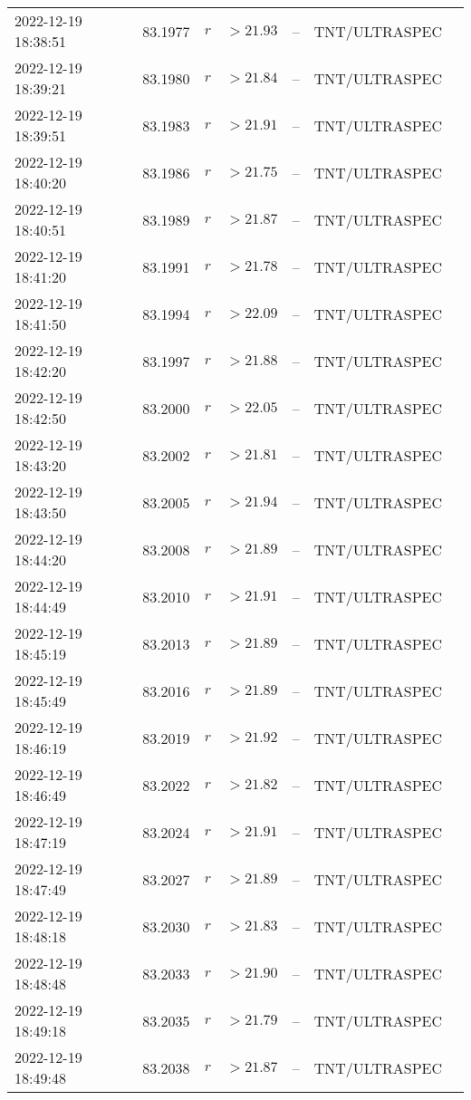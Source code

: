 \documentclass{nature_plusfigure}
\begin{document}
\begin{supplement}
\begin{center}
\begin{longtable}{lllllll}
2022-12-19 18:38:51 & 83.1977 & $r$ & $>21.93$ & -- & TNT/ULTRASPEC &  \\ 
2022-12-19 18:39:21 & 83.1980 & $r$ & $>21.84$ & -- & TNT/ULTRASPEC &  \\ 
2022-12-19 18:39:51 & 83.1983 & $r$ & $>21.91$ & -- & TNT/ULTRASPEC &  \\ 
2022-12-19 18:40:20 & 83.1986 & $r$ & $>21.75$ & -- & TNT/ULTRASPEC &  \\ 
2022-12-19 18:40:51 & 83.1989 & $r$ & $>21.87$ & -- & TNT/ULTRASPEC &  \\ 
2022-12-19 18:41:20 & 83.1991 & $r$ & $>21.78$ & -- & TNT/ULTRASPEC &  \\ 
2022-12-19 18:41:50 & 83.1994 & $r$ & $>22.09$ & -- & TNT/ULTRASPEC &  \\ 
2022-12-19 18:42:20 & 83.1997 & $r$ & $>21.88$ & -- & TNT/ULTRASPEC &  \\ 
2022-12-19 18:42:50 & 83.2000 & $r$ & $>22.05$ & -- & TNT/ULTRASPEC &  \\ 
2022-12-19 18:43:20 & 83.2002 & $r$ & $>21.81$ & -- & TNT/ULTRASPEC &  \\ 
2022-12-19 18:43:50 & 83.2005 & $r$ & $>21.94$ & -- & TNT/ULTRASPEC &  \\ 
2022-12-19 18:44:20 & 83.2008 & $r$ & $>21.89$ & -- & TNT/ULTRASPEC &  \\ 
2022-12-19 18:44:49 & 83.2010 & $r$ & $>21.91$ & -- & TNT/ULTRASPEC &  \\ 
2022-12-19 18:45:19 & 83.2013 & $r$ & $>21.89$ & -- & TNT/ULTRASPEC &  \\ 
2022-12-19 18:45:49 & 83.2016 & $r$ & $>21.89$ & -- & TNT/ULTRASPEC &  \\ 
2022-12-19 18:46:19 & 83.2019 & $r$ & $>21.92$ & -- & TNT/ULTRASPEC &  \\ 
2022-12-19 18:46:49 & 83.2022 & $r$ & $>21.82$ & -- & TNT/ULTRASPEC &  \\ 
2022-12-19 18:47:19 & 83.2024 & $r$ & $>21.91$ & -- & TNT/ULTRASPEC &  \\ 
2022-12-19 18:47:49 & 83.2027 & $r$ & $>21.89$ & -- & TNT/ULTRASPEC &  \\ 
2022-12-19 18:48:18 & 83.2030 & $r$ & $>21.83$ & -- & TNT/ULTRASPEC &  \\ 
2022-12-19 18:48:48 & 83.2033 & $r$ & $>21.90$ & -- & TNT/ULTRASPEC &  \\ 
2022-12-19 18:49:18 & 83.2035 & $r$ & $>21.79$ & -- & TNT/ULTRASPEC &  \\ 
2022-12-19 18:49:48 & 83.2038 & $r$ & $>21.87$ & -- & TNT/ULTRASPEC &  \\ 

\end{longtable}
\end{center}
\end{supplement}
\end{document}
